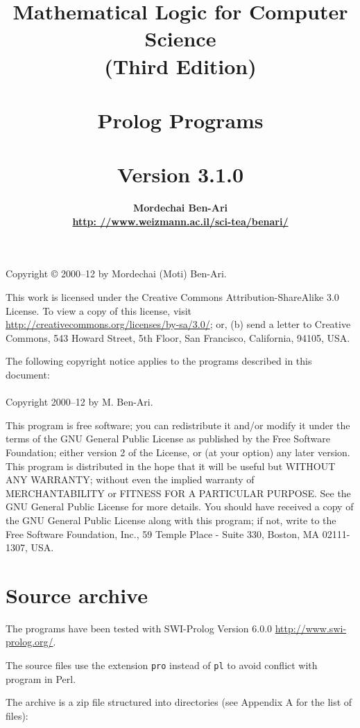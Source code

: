 \documentclass[11pt]{article}
\author{\bfseries Mordechai Ben-Ari\\\url{http: //www.weizmann.ac.il/sci-tea/benari/}}
\title{\bfseries Mathematical Logic for Computer Science\\
\bfseries\large (Third Edition)\\\mbox{}\\
\bfseries\Large Prolog Programs\\\mbox{}\\
\bfseries\normalsize Version 3.1.0}
\newcommand*{\p}[1]{\textup{\texttt{#1}}}
\begin{document}
\maketitle
\thispagestyle{empty}

\bigskip

\begin{center}
Copyright \copyright{} 2000--12 by Mordechai (Moti) Ben-Ari.
\end{center}
This work is licensed under the Creative Commons Attribution-ShareAlike 3.0
License. To view a copy of this license, visit
\url{http://creativecommons.org/licenses/by-sa/3.0/}; or, (b) send a letter
to Creative Commons, 543 Howard Street, 5th Floor, San Francisco,
California, 94105, USA.

\vfill
 
\begin{center}
The following copyright notice applies to the programs described in this
document:\mbox{}\\\mbox{}\\
Copyright 2000--12 by M. Ben-Ari.
\end{center}

This program is free software; you can redistribute it and/or
modify it under the terms of the GNU General Public License
as published by the Free Software Foundation; either version 2
of the License, or (at your option) any later version.
This program is distributed in the hope that it will be useful
but WITHOUT ANY WARRANTY; without even the implied warranty of
MERCHANTABILITY or FITNESS FOR A PARTICULAR PURPOSE.
See the GNU General Public License for more details.
You should have received a copy of the GNU General Public License
along with this program; if not, write to the Free Software
Foundation, Inc., 59 Temple Place - Suite 330, Boston, MA
02111-1307, USA.

\newpage



\section{Source archive}\label{s.archive}

The programs have been tested with SWI-Prolog Version 6.0.0
\url{http://www.swi-prolog.org/}.

The source files use the extension \p{pro} instead of
\p{pl} to avoid conflict with program in Perl.

The archive is a zip file structured into directories (see Appendix A
for the list of files):
\end{document}
